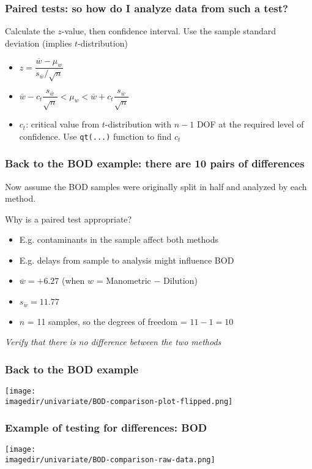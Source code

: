 \begin{frame}\frametitle{Paired tests: so how do I analyze data from such a test?}

	Calculate the $z$-value, then confidence interval. Use the sample standard deviation (implies $t$-distribution)
	\begin{itemize}
		\item	$z = \dfrac{\overline{w} - \mu_w}{s_{\overline{w}} / \sqrt{n}}$
	\end{itemize}
	\begin{itemize}
		\item	$\overline{w} - c_t \dfrac{s_{\overline{w}}}{\sqrt{n}} < \mu_w < \overline{w} + c_t \dfrac{s_{\overline{w}}}{\sqrt{n}}$
	\end{itemize}
	\begin{itemize}
		\item	$c_t$: critical value from $t$-distribution with $n-1$ DOF at the required level of confidence. Use \texttt{qt(...)} function to find $c_t$
	\end{itemize}
\end{frame}

\begin{frame}\frametitle{Back to the BOD example: there are 10 pairs of differences}

	Now assume the BOD samples were originally split in half and analyzed by each method.

	\vspace{12pt}
	Why is a paired test appropriate?
	\begin{itemize}
		\item	E.g. contaminants in the sample affect both methods
		\item	E.g. delays from sample to analysis might influence BOD
	\end{itemize}
	\begin{itemize}
		\item	$\overline{w} = +6.27$ (when $w$ = Manometric $-$ Dilution)
		\item	$s_{\overline{w}} = 11.77$
		\item	$n$ = 11 samples, so the degrees of freedom = $11 - 1= 10$
	\end{itemize}

	\emph{Verify that there is no difference between the two methods}
\end{frame}

\begin{frame}\frametitle{Back to the BOD example}
	\begin{center}
		\texttt{[image: \\imagedir/univariate/BOD-comparison-plot-flipped.png]}
	\end{center}
\end{frame}

\begin{frame}\frametitle{Example of testing for differences: BOD}
	\begin{center}
		\texttt{[image: \\imagedir/univariate/BOD-comparison-raw-data.png]}
	\end{center}
\end{frame}

